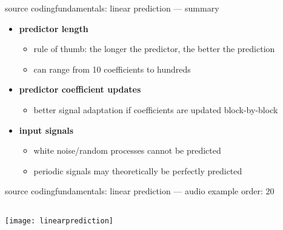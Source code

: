 	\begin{frame}{source coding}{fundamentals: linear prediction --- summary}
		\begin{itemize}
			\item 	\textbf{predictor length}
				\begin{itemize}
					\item	rule of thumb: the longer the predictor, the better the prediction
					\item	can range from 10 coefficients to hundreds
				\end{itemize}
			\pause
            \bigskip
			\item	\textbf{predictor coefficient updates}
				\begin{itemize}
					\item	better signal adaptation if coefficients are updated block-by-block
				\end{itemize}
			\pause
            \bigskip
			\item	\textbf{input signals}
				\begin{itemize}
					\item	white noise/random processes cannot be predicted
					\item	periodic signals may theoretically be perfectly predicted
				\end{itemize}
		\end{itemize}
	\end{frame}
	\begin{frame}{source coding}{fundamentals: linear prediction --- audio example}
        order: 20
        \begin{columns}
					\texttt{[image: linearprediction]}
                \vspace{-50mm}
                
                
                \vspace{10mm}

                
                \vspace{10mm}

			\end{columns}
	\end{frame}

